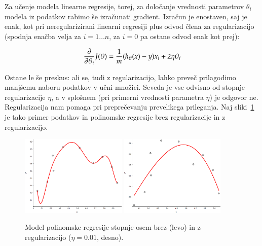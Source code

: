 Za učenje modela linearne regresije, torej, za določanje vrednosti parametrov $\theta_i$ modela iz podatkov rabimo še izračunati gradient. Izračun je enostaven, saj je enak, kot pri neregularizirani linearni regresiji plus odvod člena za regularizacijo (spodnja enačba velja za $i=1\ldots n$, za $i=0$ pa ostane odvod enak kot prej):

\begin{equation}
{\partial\over\partial\theta_i} J(\theta) = {1\over m}(h_\theta(x)-y)x_i + 2\eta\theta_i
\end{equation}

Ostane le še preskus: ali se, tudi z regularizacijo, lahko preveč prilagodimo manjšemu naboru podatkov v učni množici. Seveda je vse odvisno od stopnje regularizacije $\eta$, a v splošnem (pri primerni vrednosti parametra $\eta$) je odgovor ne. Regularizacija nam pomaga pri preprečevanju prevelikega prileganja. Naj sliki~\ref{fig:poly-reg-compare} je tako primer podatkov in polinomske regresije brez regularizacije in z regularizacijo.

\begin{figure}[htbp]
\begin{center}
  \includegraphics[width=0.45\textwidth]{slike/poly-reg-no.png}
  \hfill
  \includegraphics[width=0.45\textwidth]{slike/poly-reg-yes.png}
\caption{Model polinomske regresije stopnje osem brez (levo) in z regularizacijo ($\eta=0.01$, desno).}
\label{fig:poly-reg-compare}
\end{center}
\end{figure}
